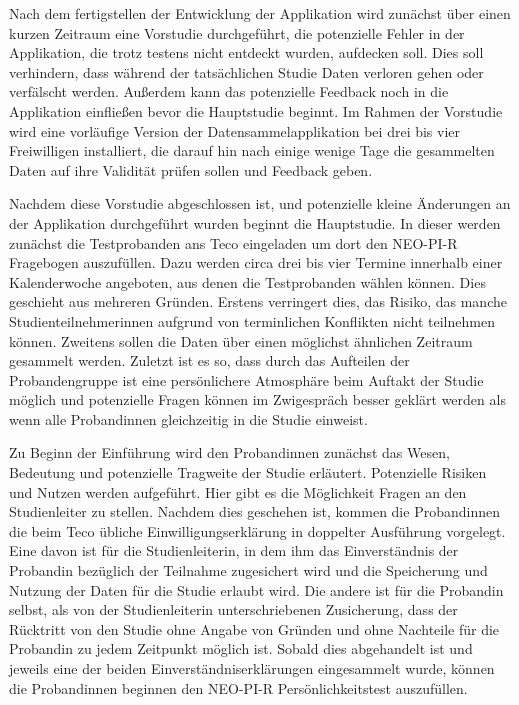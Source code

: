 Nach dem fertigstellen der Entwicklung der Applikation wird zunächst über einen kurzen Zeitraum
eine Vorstudie durchgeführt, die potenzielle Fehler in der Applikation, die trotz testens nicht entdeckt wurden, aufdecken soll.
Dies soll verhindern, dass während der tatsächlichen Studie Daten verloren gehen oder verfälscht werden.
Außerdem kann das potenzielle Feedback noch in die Applikation einfließen bevor die Hauptstudie beginnt.
Im Rahmen der Vorstudie wird eine vorläufige Version der Datensammelapplikation bei drei bis vier Freiwilligen installiert,
die darauf hin nach einige wenige Tage die gesammelten Daten auf ihre Validität prüfen sollen und Feedback geben.
\par
Nachdem diese Vorstudie abgeschlossen ist, und potenzielle kleine Änderungen an der Applikation durchgeführt wurden beginnt die Hauptstudie.
In dieser werden zunächst die Testprobanden ans Teco eingeladen um dort den NEO-PI-R Fragebogen auszufüllen.
Dazu werden circa drei bis vier Termine innerhalb einer Kalenderwoche angeboten, aus denen die Testprobanden wählen können.
Dies geschieht aus mehreren Gründen. 
Erstens verringert dies, das Risiko, das manche Studienteilnehmerinnen aufgrund von terminlichen Konflikten nicht teilnehmen können.
Zweitens sollen die Daten über einen möglichst ähnlichen Zeitraum gesammelt werden.
Zuletzt ist es so, dass durch das Aufteilen der Probandengruppe ist eine persönlichere Atmosphäre beim Auftakt der Studie möglich
und potenzielle Fragen können im Zwigespräch besser geklärt werden als wenn alle Probandinnen gleichzeitig in die Studie einweist.
\par
Zu Beginn der Einführung wird den Probandinnen zunächst das Wesen, Bedeutung und potenzielle Tragweite der Studie erläutert.
Potenzielle Risiken und Nutzen werden aufgeführt.
Hier gibt es die Möglichkeit Fragen an den Studienleiter zu stellen.
Nachdem dies geschehen ist, kommen die Probandinnen die beim Teco übliche Einwilligungserklärung in doppelter Ausführung vorgelegt.
Eine davon ist für die Studienleiterin, in dem ihm das Einverständnis der Probandin bezüglich der Teilnahme zugesichert wird und die Speicherung und Nutzung der Daten für die Studie erlaubt wird.
Die andere ist für die Probandin selbst, als von der Studienleiterin unterschriebenen Zusicherung, dass der Rücktritt von den Studie ohne Angabe von Gründen und ohne Nachteile für die Probandin zu jedem Zeitpunkt möglich ist.
Sobald dies abgehandelt ist und jeweils eine der beiden Einverständniserklärungen eingesammelt wurde,
können die Probandinnen beginnen den NEO-PI-R Persönlichkeitstest auszufüllen.
